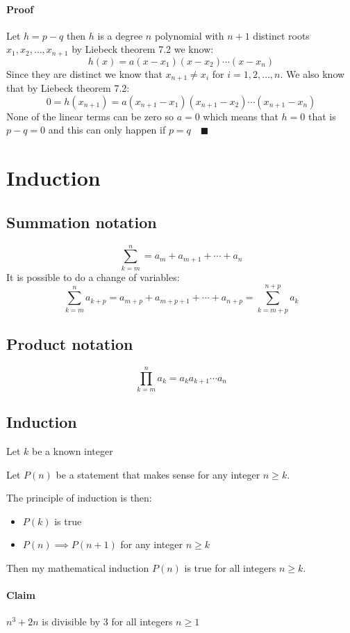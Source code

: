 \documentclass{article}
\begin{document}
\paragraph{Proof} Let \(h=p-q\) then \(h\) is a degree \(n\) polynomial with \(n+1\) distinct roots \(x_1,x_2,\dotsc,x_{n+1}\) by Liebeck theorem 7.2 we know:
\[h(x)=a(x-x_1)(x-x_2)\dotsm(x-x_n)\]
Since they are distinct we know that \(x_{n+1}\ne x_i\) for \(i=1,2,\dotsc,n\). We also know that by Liebeck theorem 7.2:
\[0=h(x_{n+1})=a(x_{n+1}-x_1)(x_{n+1}-x_2)\dotsm(x_{n+1}-x_n)\]
None of the linear terms can be zero so \(a=0\) which means that \(h=0\) that is \(p-q=0\) and this can only happen if \(p=q\quad\blacksquare\)

\section{Induction}

\subsection*{Summation notation}

\[\sum_{k=m}^n=a_m+a_{m+1}+\dotsb+a_n\]
It is possible to do a change of variables:
\[\sum_{k=m}^na_{k+p}=a_{m+p}+a_{m+p+1}+\dotsb+a_{n+p}=\sum_{k=m+p}^{n+p}a_k\]

\subsection*{Product notation}

\[\prod_{k=m}^na_k=a_ka_{k+1}\dotsm a_n\]

\subsection*{Induction}

Let \(k\) be a known integer

Let \(P(n)\) be a statement that makes sense for any integer \(n\ge k\).

The principle of induction is then:
\begin{itemize}
\item \(P(k)\) is true
\item \(P(n)\implies P(n+1)\) for any integer \(n\ge k\)
\end{itemize}
Then my mathematical induction \(P(n)\) is true for all integers \(n\ge k\).

\paragraph{Claim} \(n^3+2n\) is divisible by 3 for all integers \(n\ge 1\)
\end{document}
